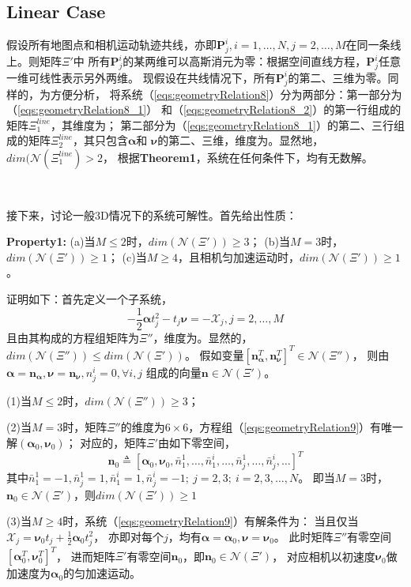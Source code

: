 \documentclass{article}
\begin{document}
\subsection{Linear Case}
假设所有地图点和相机运动轨迹共线，亦即$\textbf{P}_j^i,i=1,\dots,N,j=2,\dots,M$在同一条线上。则矩阵$\Xi'$中
所有$\textbf{P}_j^i$的某两维可以高斯消元为零：根据空间直线方程，$\textbf{P}_j^i$任意一维可线性表示另外两维。
现假设在共线情况下，所有$\textbf{P}_j^i$的第二、三维为零。同样的，为方便分析，
将系统（\ref{eqs:geometryRelation8}）分为两部分：第一部分为（\ref{eqs:geometryRelation8_1}）
和（\ref{eqs:geometryRelation8_2}）的第一行组成的矩阵$\Xi_1^{line}$，其维度为{\color{red}{$(M-1)N\times (MN+2)$}}；
第二部分为（\ref{eqs:geometryRelation8_1}）的第二、三行组成的矩阵$\Xi_2^{line}$，其只包含$\mathbf{\alpha}$和
$\mathbf{\nu}$的第二、三维，维度为{\color{red}{$2(M-1)\times 4$}}。显然地，$dim(\mathcal{N}(\Xi_1^{line})>2$，
根据\textbf{Theorem1}，系统在任何条件下，均有无数解。
\par
\ 
\par
接下来，讨论一般3D情况下的系统可解性。首先给出性质：
\par
\textbf{Property1: } (a)当$M\leqslant 2$时，$dim(\mathcal{N}(\Xi'))\geqslant 3$；
(b)当$M=3$时，$dim(\mathcal{N}(\Xi'))\geqslant 1$；
(c)当$M\geqslant 4$，且相机匀加速运动时，$dim(\mathcal{N}(\Xi'))\geqslant 1$。
\par
证明如下：首先定义一个子系统，
\begin{equation}\label{eqs:geometryRelation9}
    -\frac{1}{2}\mathbf{\alpha}t_j^2-t_j\mathbf{\nu}=-\mathcal{X}_j, j=2,\dots,M
\end{equation}
且由其构成的方程组矩阵为$\Xi''$，维度为{\color{red}{$3(M-1)\times 6$}}。显然的，$dim(\mathcal{N}(\Xi''))\leqslant dim(\mathcal{N}(\Xi'))$。
假如变量$\left[\textbf{n}_\mathbf{\alpha}^T,\textbf{n}_\mathbf{\nu}^T\right]^T\in\mathcal{N}(\Xi'')$，
则由$\mathbf{\alpha}=\textbf{n}_{\mathbf{\alpha}},\mathbf{\nu}=\textbf{n}_{\mathbf{\nu}},n_j^i=0, \forall i,j$
组成的向量$\textbf{n}\in \mathcal{N}(\Xi')$。
\par
(1)当$M\leqslant 2$时，$dim(\mathcal{N}(\Xi''))\geqslant 3$；
\par
(2)当$M=3$时，矩阵$\Xi''$的维度为$6\times 6$，方程组（\ref{eqs:geometryRelation9}）有唯一解$(\mathbf{\alpha}_0,\mathbf{\nu}_0)$；
对应的，矩阵$\Xi'$由如下零空间，
\begin{equation}
    \textbf{n}_0\triangleq \left[\mathbf{\alpha}_0,\mathbf{\nu}_0,\bar{n}_1^1,\dots,\bar{n}_1^i,
    \dots,\bar{n}_j^1,\dots,\bar{n}_j^i,\dots\right]^T
\end{equation}
其中$\bar{n}_1^1=-1,\bar{n}_j^1=1,\bar{n}_1^i=1,\bar{n}_j^i=-1;\ j=2,3;\ i=2,3,\dots,N$。
即当$M=3$时，$\textbf{n}_0\in \mathcal{N}(\Xi')$，则$dim(\mathcal{N}(\Xi'))\geqslant 1$
\par
(3)当$M\geqslant 4$时，系统（\ref{eqs:geometryRelation9}）有解条件为：
当且仅当$\mathcal{X}_j=\mathbf{\nu}_{0}t_{j}+\frac{1}{2}\mathbf{\alpha}_0t_j^2$，
亦即对每个$j$，均有$\mathbf{\alpha}=\mathbf{\alpha}_0, \mathbf{\nu}=\mathbf{\nu}_0$。
此时矩阵$\Xi''$有零空间$\left[\mathbf{\alpha}_0^T,\mathbf{\nu}_0^T\right]^T$，
进而矩阵$\Xi'$有零空间$\textbf{n}_0$，即$\textbf{n}_0\in \mathcal{N}(\Xi')$，
对应相机以初速度$\mathbf{\nu}_0$做加速度为$\mathbf{\alpha}_0$的匀加速运动。
\end{document}
